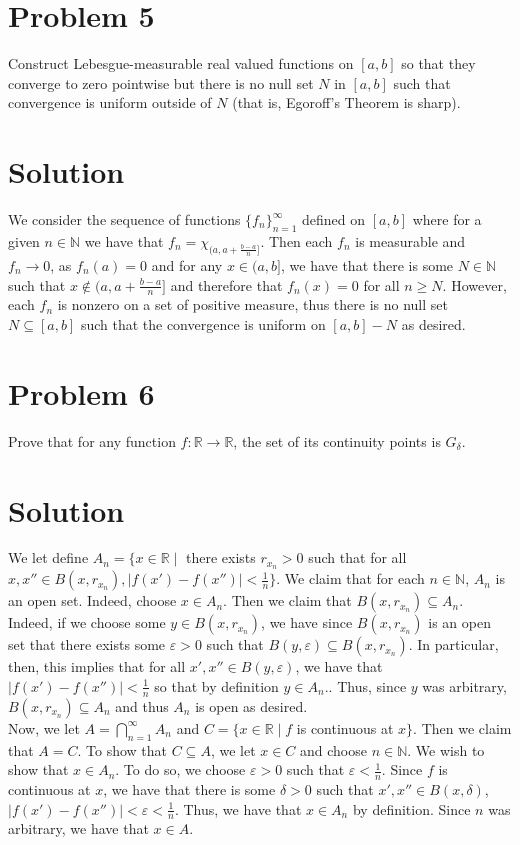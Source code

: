 \documentclass{article}
\begin{document}
\section*{Problem 5}
Construct Lebesgue-measurable real valued functions on $[a,b]$ so that they converge to zero pointwise but there is no null set $N$ in $[a,b]$ such that convergence is uniform outside of $N$ (that is, Egoroff's Theorem is sharp).

\section*{Solution}
We consider the sequence of functions $\{f_n\}_{n=1}^\infty$ defined on $[a,b]$ where for a given $n\in\mathbb{N}$ we have that $f_n=\chi_{(a,a+\frac{b-a}{n}]}$.  Then each $f_n$ is measurable and $f_n\rightarrow 0$, as $f_n(a)=0$ and for any $x\in(a,b]$, we have that there is some $N\in\mathbb{N}$ such that $x\not\in(a,a+\frac{b-a}{n}]$ and therefore that $f_n(x)=0$ for all $n\geq N$.  However, each $f_n$ is nonzero on a set of positive measure, thus there is no null set $N\subseteq [a,b]$ such that the convergence is uniform on $[a,b]-N$ as desired.

\section*{Problem 6}
Prove that for any function $f:\mathbb{R}\rightarrow\mathbb{R}$, the set of its continuity points is $G_\delta$.

\section*{Solution}
We let define $A_n=\{x\in\mathbb{R}\mid$ there exists $r_{x_n}>0$ such that for all $x,x''\in B(x,r_{x_n}),|f(x')-f(x'')|<\frac{1}{n}\}$.  We claim that for each $n\in\mathbb{N}$, $A_n$ is an open set.  Indeed, choose $x\in A_n$.  Then we claim that $B(x,r_{x_n})\subseteq A_n$.  Indeed, if we choose some $y\in B(x,r_{x_n})$, we have since $B(x,r_{x_n})$ is an open set that there exists some $\varepsilon>0$ such that $B(y,\varepsilon)\subseteq B(x,r_{x_n})$.  In particular, then, this implies that for all $x',x''\in B(y,\varepsilon)$, we have that $|f(x')-f(x'')|<\frac{1}{n}$ so that by definition $y\in A_n$..  Thus, since $y$ was arbitrary, $B(x,r_{x_n})\subseteq A_n$ and thus $A_n$ is open as desired.\\

\noindent Now, we let $A=\bigcap_{n=1}^\infty A_n$ and $C=\{x\in\mathbb{R}\mid f$ is continuous at $x\}$.  Then we claim that $A=C$.  To show that $C\subseteq A$, we let $x\in C$ and choose $n\in\mathbb{N}$.  We wish to show that $x\in A_n$.  To do so, we choose $\varepsilon>0$ such that $\varepsilon<\frac{1}{n}$.  Since $f$ is continuous at $x$, we have that there is some $\delta>0$ such that $x', x''\in B(x,\delta)$, $|f(x')-f(x'')|<\varepsilon<\frac{1}{n}$.  Thus, we have that $x\in A_n$ by definition.  Since $n$ was arbitrary, we have that $x\in A$.\\
\end{document}
